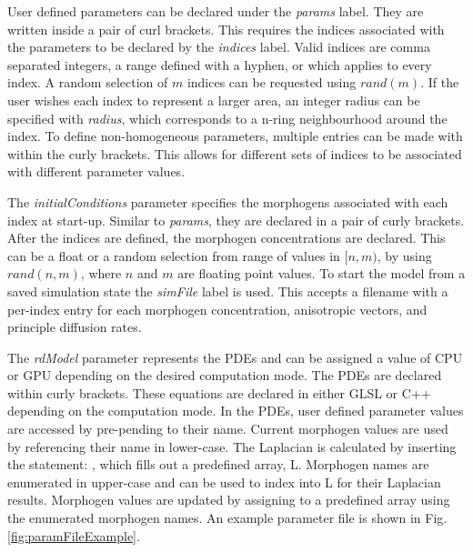 User defined parameters can be declared under the \textit{params} label. They are written inside a pair of curl brackets. This requires the indices associated with the parameters to be declared by the \textit{indices} label. Valid indices are comma separated integers, a range defined with a hyphen, or  which applies to every index. A random selection of $m$ indices can be requested using $rand(m)$. If the user wishes each index to represent a larger area, an integer radius can be specified with \textit{radius}, which corresponds to a n-ring neighbourhood around the index. To define non-homogeneous parameters, multiple entries can be made with within the curly brackets. This allows for different sets of indices to be associated with different parameter values.

The \textit{initialConditions} parameter specifies the morphogens associated with each index at start-up. Similar to \textit{params}, they are declared in a pair of curly brackets. After the indices are defined, the morphogen concentrations are declared. This can be a float or a random selection from range of values in $[n, m)$, by using $rand(n, m)$, where $n$ and $m$ are floating point values. To start the model from a saved simulation state the \textit{simFile} label is used. This accepts a filename with a per-index entry for each morphogen concentration, anisotropic vectors, and principle diffusion rates.

The \textit{rdModel} parameter represents the PDEs and can be assigned a value of CPU or GPU depending on the desired computation mode. The PDEs are declared within curly brackets. These equations are declared in either GLSL or C++ depending on the computation mode. In the PDEs, user defined parameter values are accessed by pre-pending  to their name. Current morphogen values are used by referencing their name in lower-case. The Laplacian is calculated by inserting the statement: , which fills out a predefined array, L. Morphogen names are enumerated in upper-case and can be used to index into L for their Laplacian results. Morphogen values are updated by assigning to a predefined  array using the enumerated morphogen names. An example parameter file is shown in Fig. \ref{fig:paramFileExample}.


